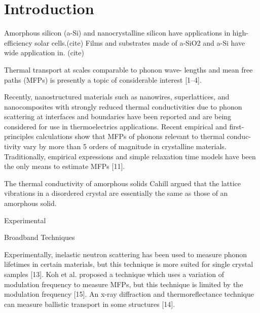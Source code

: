 \documentclass[aps,prb,twocolumn,superscriptaddress,footinbib,amsmath,amssymb,floatfix]{revtex4}
\begin{document}
\section{\label{S:Introduction}Introduction}

Amorphous silicon (a-Si) and nanocrystalline silicon have applications 
in high-efficiency solar cells.(cite) 
Films and substrates made of a-SiO2 and a-Si have wide application in.
(cite) 

Thermal transport at scales comparable to phonon wave-
lengths and mean free paths (MFPs) is presently a topic of
considerable interest [1–4].\cite{cahill_nanoscale_2003,
yu_reduction_2010,hochbaum_enhanced_2008,pernot_precise_2010}

Recently, nanostructured materials
such as nanowires, superlattices, and nanocomposites with
strongly reduced thermal conductivities due to phonon
scattering at interfaces and boundaries have been reported
and are being considered for use in thermoelectrics applications.
\cite{hochbaum_enhanced_2008,pernot_precise_2010,
boukai_silicon_2008,poudel_high-thermoelectric_2008}
Recent empirical and first-principles calculations
show that MFPs of phonons relevant to thermal conduc-
tivity vary by more than 5 orders of magnitude in crystalline 
materials.\cite{ward_intrinsic_2010}
Traditionally, empirical expressions and
simple relaxation time models have been the only means
to estimate MFPs [11].\cite{holland_analysis_1963} 

The thermal conductivity of amorphous solids 
\cite{freeman_thermal_1986} 
Cahill argued that the lattice vibrations 
in a disordered crystal are essentially the same as those of an 
amorphous solid.\cite{cahill_lower_1992} 



Experimental

Broadband Techniques

Experimentally, inelastic neutron scattering has been
used to measure phonon lifetimes in certain materials,
but this technique is more suited for single crystal samples
[13].\cite{christianson_phonon_2008} 
Koh et al. proposed a technique which uses a variation of
modulation frequency to measure MFPs, but this technique
is limited by the modulation frequency [15].
\cite{koh_frequency_2007}
An x-ray diffraction and thermoreflectance technique
can measure ballistic transport in some structures [14].
\cite{highland_ballistic-phonon_2007}
\end{document}
